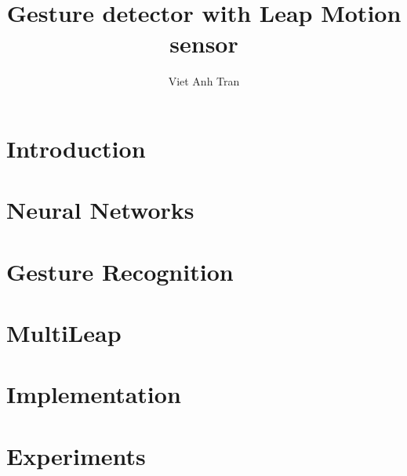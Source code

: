 \documentclass[thesis=B,english]{FITthesis}[2020/10/23]
\title{Gesture detector with Leap Motion sensor}
\author{Viet Anh Tran} %
\begin{document}
	\chapter{Introduction}\label{ch:introduction}
	\newpage\cleardoublepage
	\chapter{Neural Networks}\label{ch:neural_network}
	\newpage\cleardoublepage
	\chapter{Gesture Recognition}\label{ch:gesture_recognition}
	\newpage\cleardoublepage
	\chapter{MultiLeap}\label{ch:multileap}
	\newpage\cleardoublepage
	\chapter{Implementation}\label{ch:implementation}
	\newpage\cleardoublepage
	\chapter{Experiments}\label{ch:experiments}
	\newpage\cleardoublepage
\end{document}
